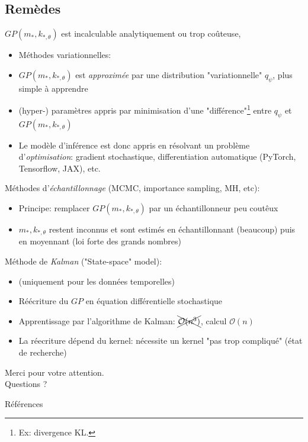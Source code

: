 \documentclass[xcolor=svgnames, t]{beamer}
\newcommand{\coloredemph}[1]{\textcolor{internationalblue}{\emph{#1}}}
\newcommand{\tored}[1]{\textcolor{red}{#1}}
\begin{document}
\subsection{Remèdes}
\begin{frame}{\subsecname}
  $GP( m_{*}, k_{*, \theta} )$ est incalculable analytiquement ou trop coûteuse,
  \begin{itemize}
    \item Méthodes variationnelles: \cite{Bruinsma2020,Hensman2015}
    \item $GP( m_{*}, k_{*, \theta} )$ est \coloredemph{approximée} par une distribution "variationnelle" $q_{\psi}$, plus simple à apprendre
    \pause
    \item (hyper-) paramètres appris par minimisation d'une "différence"\footnote{Ex: divergence KL.}  entre $q_{\psi}$ et $GP( m_{*}, k_{*, \theta} )$
    \pause
    \item Le modèle d'inférence est donc appris en résolvant un problème d'\coloredemph{optimisation}: gradient stochastique, differentiation automatique (PyTorch, Tensorflow, JAX), etc.
  \end{itemize}
\end{frame}

\begin{frame}{\subsecname}
  Méthodes d'\coloredemph{échantillonnage} (MCMC, importance sampling, MH, etc): \cite{Rasmussen2006}
  \begin{itemize}
    \item Principe: remplacer $GP( m_{*}, k_{*, \theta} )$ par un échantillonneur peu coutêux
    \pause
    \item $m_{*}, k_{*, \theta}$ restent inconnus et sont estimés en échantillonnant (beaucoup) puis en moyennant (loi forte des grands nombres)
  \end{itemize}
  \pause
  Méthode de \coloredemph{Kalman} ("State-space" model): \cite{Solin2014,Titsias2024}
  \begin{itemize}
    \item (uniquement pour les données temporelles)
    \pause
    \item Réécriture du $GP$ en équation différentielle stochastique
    \pause
    \item Apprentissage par l'algorithme de Kalman: $\xcancel{\mathcal{O}(n^3)}$, calcul $\mathcal{O}(n)$
    \pause
    \item La réecriture dépend du kernel: nécessite un kernel "pas trop compliqué" (état de recherche)
  \end{itemize}
\end{frame}

\begin{frame}
  Merci pour votre attention.
  \\
  Questions ?
\end{frame}

%
\begin{frame}[allowframebreaks]{Références}
  \printbibliography
\end{frame}
\end{document}
